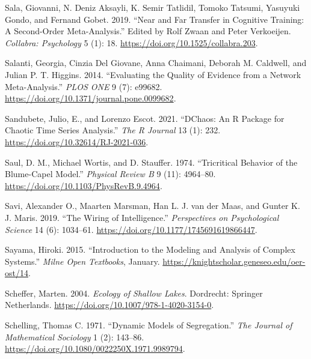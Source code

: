 \documentclass[
  letterpaper,
]{scrbook}
\newlength{\cslhangindent}
\newlength{\cslentryspacingunit} %
\newenvironment{CSLReferences}[2] %
 {%
  \setlength{\parindent}{0pt}
  \ifodd #1
  \let\oldpar\par
  \def\par{\hangindent=\cslhangindent\oldpar}
  \fi
  \setlength{\parskip}{#2\cslentryspacingunit}
 }%
 {}
\begin{document}
\begin{CSLReferences}{1}{0}
\leavevmode{}%
Sala, Giovanni, N. Deniz Aksayli, K. Semir Tatlidil, Tomoko Tatsumi,
Yasuyuki Gondo, and Fernand Gobet. 2019. {``Near and {Far Transfer} in
{Cognitive Training}: {A Second-Order Meta-Analysis}.''} Edited by Rolf
Zwaan and Peter Verkoeijen. \emph{Collabra: Psychology} 5 (1): 18.
\url{https://doi.org/10.1525/collabra.203}.

\leavevmode{}%
Salanti, Georgia, Cinzia Del Giovane, Anna Chaimani, Deborah M.
Caldwell, and Julian P. T. Higgins. 2014. {``Evaluating the Quality of
Evidence from a Network Meta-Analysis.''} \emph{PLOS ONE} 9 (7): e99682.
\url{https://doi.org/10.1371/journal.pone.0099682}.

\leavevmode{}%
Sandubete, Julio, E., and Lorenzo Escot. 2021. {``{DChaos}: {An R
Package} for {Chaotic Time Series Analysis}.''} \emph{The R Journal} 13
(1): 232. \url{https://doi.org/10.32614/RJ-2021-036}.

\leavevmode{}%
Saul, D. M., Michael Wortis, and D. Stauffer. 1974. {``Tricritical
Behavior of the {Blume-Capel} Model.''} \emph{Physical Review B} 9 (11):
4964--80. \url{https://doi.org/10.1103/PhysRevB.9.4964}.

\leavevmode{}%
Savi, Alexander O., Maarten Marsman, Han L. J. van der Maas, and Gunter
K. J. Maris. 2019. {``The {Wiring} of {Intelligence}.''}
\emph{Perspectives on Psychological Science} 14 (6): 1034--61.
\url{https://doi.org/10.1177/1745691619866447}.

\leavevmode{}%
Sayama, Hiroki. 2015. {``Introduction to the Modeling and Analysis of
Complex Systems.''} \emph{Milne Open Textbooks}, January.
\url{https://knightscholar.geneseo.edu/oer-ost/14}.

\leavevmode{}%
Scheffer, Marten. 2004. \emph{Ecology of {Shallow Lakes}}. {Dordrecht}:
{Springer Netherlands}. \url{https://doi.org/10.1007/978-1-4020-3154-0}.

\leavevmode{}%
Schelling, Thomas C. 1971. {``Dynamic Models of Segregation.''}
\emph{The Journal of Mathematical Sociology} 1 (2): 143--86.
\url{https://doi.org/10.1080/0022250X.1971.9989794}.


\end{CSLReferences}
\end{document}
